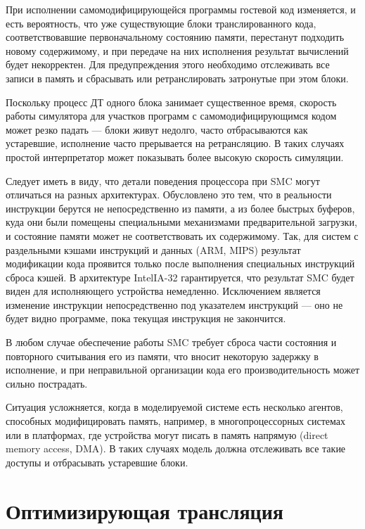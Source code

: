 При исполнении самомодифицирующейся программы гостевой код изменяется, и есть вероятность, что уже существующие блоки транслированного кода, соответствовавшие первоначальному состоянию памяти, перестанут подходить новому содержимому, и при передаче на них исполнения результат вычислений будет некорректен.  Для предупреждения этого необходимо отслеживать все записи в память и сбрасывать или ретранслировать затронутые при этом блоки. 

Поскольку процесс ДТ одного блока занимает существенное время, скорость работы симулятора для участков программ с самомодифицирующимся кодом  может резко падать --- блоки живут недолго, часто отбрасываются как устаревшие, исполнение часто прерывается на ретрансляцию. В таких случаях простой интерпретатор может показывать более высокую скорость симуляции.

Следует иметь в виду, что детали поведения процессора при SMC могут отличаться на разных архитектурах. Обусловлено это тем, что в реальности инструкции берутся не непосредственно из памяти, а из более быстрых буферов, куда они были помещены специальными механизмами предварительной загрузки, и состояние памяти может не соответствовать их содержимому. Так, для систем с раздельными кэшами инструкций и данных (ARM, MIPS) результат модификации кода проявится только после выполнения  специальных инструкций сброса кэшей. В архитектуре Intel\textregistered IA-32 гарантируется, что результат SMC будет виден для исполняющего устройства немедленно. Исключением является изменение инструкции непосредственно под указателем инструкций --- оно не будет видно программе, пока текущая инструкция не закончится. 

В любом случае обеспечение работы SMC требует сброса части состояния и повторного считывания его из памяти, что вносит некоторую задержку в исполнение, и при неправильной организации кода его производительность может сильно пострадать.  

Ситуация усложняется, когда в моделируемой системе есть несколько агентов, способных модифицировать память, например, в многопроцессорных системах или в платформах, где устройства могут писать в память напрямую (\abbr direct memory access, DMA). В таких случаях модель должна отслеживать все такие доступы и отбрасывать устаревшие блоки.

\section{Оптимизирующая трансляция}\label{sec:optimisations}

